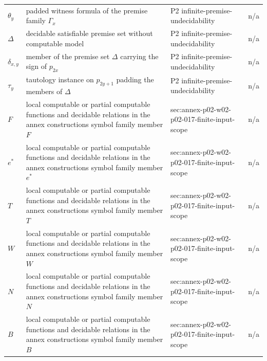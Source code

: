 \begin{longtable}{@{}p{}p{}p{}p{}@{}}
\(\theta_y\) & padded witness formula of the premise family \(\Gamma_x\) & P2 infinite-\allowbreak{}premise-\allowbreak{}undecidability & n/a \\
\(\Delta\) & decidable satisfiable premise set without computable model & P2 infinite-\allowbreak{}premise-\allowbreak{}undecidability & n/a \\
\(\delta_{x,y}\) & member of the premise set \(\Delta\) carrying the sign of \(p_{2x}\) & P2 infinite-\allowbreak{}premise-\allowbreak{}undecidability & n/a \\
\(\tau_y\) & tautology instance on \(p_{2y+1}\) padding the members of \(\Delta\) & P2 infinite-\allowbreak{}premise-\allowbreak{}undecidability & n/a \\
\(F\) & local computable or partial computable functions and decidable relations in the annex constructions symbol family member \(F\) & sec:\allowbreak{}annex-\allowbreak{}p02-\allowbreak{}w02-\allowbreak{}p02-\allowbreak{}017-\allowbreak{}finite-\allowbreak{}input-\allowbreak{}scope & n/a \\
\(e^{*}\) & local computable or partial computable functions and decidable relations in the annex constructions symbol family member \(e^{*}\) & sec:\allowbreak{}annex-\allowbreak{}p02-\allowbreak{}w02-\allowbreak{}p02-\allowbreak{}017-\allowbreak{}finite-\allowbreak{}input-\allowbreak{}scope & n/a \\
\(T\) & local computable or partial computable functions and decidable relations in the annex constructions symbol family member \(T\) & sec:\allowbreak{}annex-\allowbreak{}p02-\allowbreak{}w02-\allowbreak{}p02-\allowbreak{}017-\allowbreak{}finite-\allowbreak{}input-\allowbreak{}scope & n/a \\
\(W\) & local computable or partial computable functions and decidable relations in the annex constructions symbol family member \(W\) & sec:\allowbreak{}annex-\allowbreak{}p02-\allowbreak{}w02-\allowbreak{}p02-\allowbreak{}017-\allowbreak{}finite-\allowbreak{}input-\allowbreak{}scope & n/a \\
\(N\) & local computable or partial computable functions and decidable relations in the annex constructions symbol family member \(N\) & sec:\allowbreak{}annex-\allowbreak{}p02-\allowbreak{}w02-\allowbreak{}p02-\allowbreak{}017-\allowbreak{}finite-\allowbreak{}input-\allowbreak{}scope & n/a \\
\(B\) & local computable or partial computable functions and decidable relations in the annex constructions symbol family member \(B\) & sec:\allowbreak{}annex-\allowbreak{}p02-\allowbreak{}w02-\allowbreak{}p02-\allowbreak{}017-\allowbreak{}finite-\allowbreak{}input-\allowbreak{}scope & n/a \\

\end{longtable}
